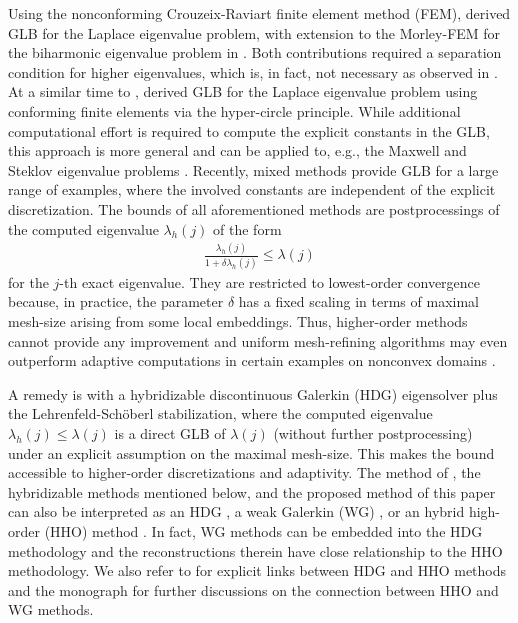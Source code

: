 \documentclass[a4paper]{amsart}
\numberwithin{equation}{section}
\theoremstyle{remark}
\theoremstyle{definition}
\theoremstyle{assumptionnoperiod}
\begin{document}
Using the nonconforming Crouzeix-Raviart finite element method (FEM), \cite{CarstensenGedicke2014} derived GLB for the Laplace eigenvalue problem, with extension to the Morley-FEM for the biharmonic eigenvalue problem in \cite{CarstensenGallistl2014}. Both contributions \cite{CarstensenGedicke2014,CarstensenGallistl2014} required a separation condition for higher eigenvalues, which is, in fact, not necessary as observed in \cite{Liu2015}.
At a similar time to \cite{CarstensenGedicke2014}, \cite{LiuOishi2013} derived GLB for the Laplace eigenvalue problem using conforming finite elements via the hyper-circle principle.
While additional computational effort is required to compute the explicit constants in the GLB, this approach is more general and can be applied to, e.g., the Maxwell and Steklov eigenvalue problems \cite{YouXieLiu2019,GallistlOlkhovskiy2023}.
Recently, mixed methods \cite{Gallistl2023} provide GLB for a large range of examples, where the involved constants are independent of the explicit discretization.
The bounds of all aforementioned methods are postprocessings of the computed eigenvalue $\lambda_h(j)$ of the form
\begin{align*}
	\frac{\lambda_h(j)}{1 + \delta \lambda_h(j)} \leq \lambda(j)
\end{align*}
for the $j$-th exact eigenvalue.
They are restricted to lowest-order convergence because, in practice, the parameter $\delta$ has a fixed scaling in terms of maximal mesh-size arising from some local embeddings. Thus, higher-order methods cannot provide any improvement and uniform mesh-refining algorithms may even outperform adaptive computations in certain examples on nonconvex domains \cite{CarstensenPuttkammer2023}.

A remedy is \cite{CarstensenZhaiZhang2020} with a hybridizable discontinuous Galerkin (HDG) eigensolver plus the Lehrenfeld-Sch\"oberl stabilization, where the computed eigenvalue $\lambda_h(j) \leq \lambda(j)$ is a direct GLB of $\lambda(j)$ (without further postprocessing) under an explicit assumption on the maximal mesh-size.
This makes the bound accessible to higher-order discretizations and adaptivity.
The method of \cite{CarstensenZhaiZhang2020}, the hybridizable methods \cite{CarstensenErnPuttkammer2021,CarstensenGraessleTran2024} mentioned below, and the proposed method of this paper can also be interpreted as an HDG \cite{CockburnGopalakrishnanLazarov2009}, a weak Galerkin (WG) \cite{WangYe2014}, or an hybrid high-order (HHO) method \cite{DiPietroErnLemaire2014,DiPietroErn2015}.
In fact, WG methods can be embedded into the HDG methodology \cite[Section 6.6]{Cockburn2016} and the reconstructions therein have close relationship to the HHO methodology. We also refer to
\cite{CockburnDiPietroErn2016} for explicit links between HDG and HHO methods and the monograph \cite{CicuttinErnPignet2021} for further discussions on the connection between HHO and WG methods.
\end{document}
